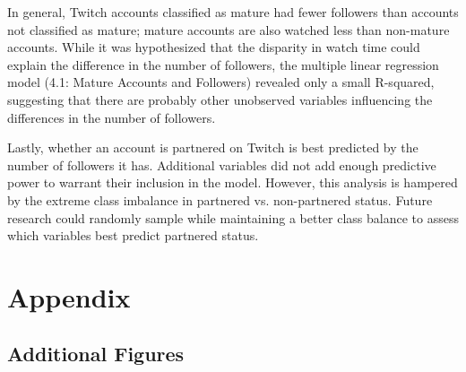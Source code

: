 \documentclass[12pt]{article}
\begin{document}
In general, Twitch accounts classified as mature had fewer followers than accounts not classified as mature; mature accounts are also watched less than non-mature accounts. While it was hypothesized that the disparity in watch time could explain the difference in the number of followers, the multiple linear regression model (4.1: Mature Accounts and Followers) revealed only a small R-squared, suggesting that there are probably other unobserved variables influencing the differences in the number of followers. 

Lastly, whether an account is partnered on Twitch is best predicted by the number of followers it has. Additional variables did not add enough predictive power to warrant their inclusion in the model. However, this analysis is hampered by the extreme class imbalance in partnered vs. non-partnered status. Future research could randomly sample while maintaining a better class balance to assess which variables best predict partnered status.  












\newpage 

\section{Appendix}

\subsection{Additional Figures}
\end{document}
